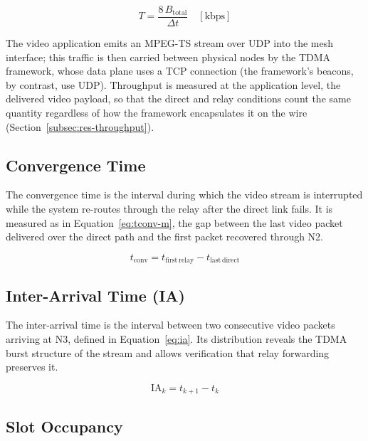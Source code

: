 \begin{equation}
T = \frac{8\,B_{\mathrm{total}}}{\Delta t} \quad [\text{kbps}]
\label{eq:throughput}
\end{equation}

The video application emits an MPEG-TS stream over UDP into the mesh interface;
this traffic is then carried between physical nodes by the TDMA framework, whose
data plane uses a TCP connection (the framework's beacons, by contrast, use
UDP). Throughput is measured at the application level, the delivered video
payload, so that the direct and relay conditions count the same quantity
regardless of how the framework encapsulates it on the wire
(Section~\ref{subsec:res-throughput}).

\subsection{Convergence Time}
\label{subsec:m-conv}

The convergence time is the interval during which the video stream is
interrupted while the system re-routes through the relay after the direct link
fails. It is measured as in Equation~\ref{eq:tconv-m}, the gap between the last
video packet delivered over the direct path and the first packet recovered
through N2.

\begin{equation}
t_{\mathrm{conv}} = t_{\mathrm{first\,relay}} - t_{\mathrm{last\,direct}}
\label{eq:tconv-m}
\end{equation}

\subsection{Inter-Arrival Time (IA)}
\label{subsec:m-ia}

The inter-arrival time is the interval between two consecutive video packets
arriving at N3, defined in Equation~\ref{eq:ia}. Its distribution reveals the
TDMA burst structure of the stream and allows verification that relay forwarding
preserves it.

\begin{equation}
\mathrm{IA}_k = t_{k+1} - t_k
\label{eq:ia}
\end{equation}

\subsection{Slot Occupancy}
\label{subsec:m-slot}

